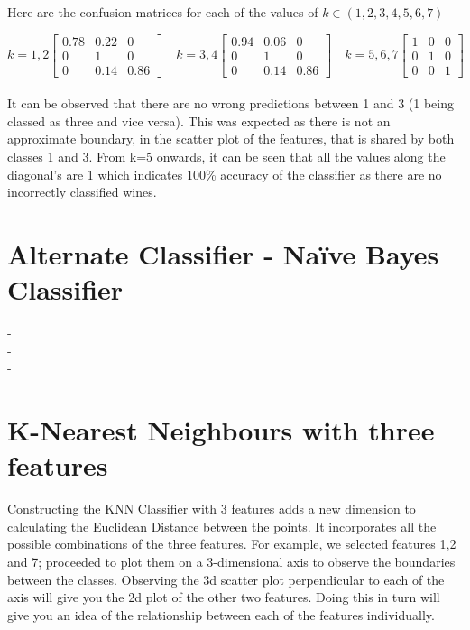\documentclass[10pt]{article}
\begin{document}
\noindent
Here are the confusion matrices for each of the values of $k \in (1,2,3,4,5,6,7)$

$$
k=1,2
\begin{bmatrix} 
0.78 & 0.22 & 0\\
0 & 1 & 0\\
0 & 0.14 & 0.86
\end{bmatrix}
\quad
k=3,4
\begin{bmatrix} 
0.94 & 0.06 & 0\\
0 & 1 & 0\\
0 & 0.14 & 0.86
\end{bmatrix}
\quad
k=5, 6, 7
\begin{bmatrix} 
1 & 0 & 0\\
0 & 1 & 0\\
0 & 0 & 1
\end{bmatrix}
\quad
$$
\\
\noindent
It can be observed that there are no wrong predictions between 1 and 3 (1 being classed as three and vice versa). This was expected as there is not an approximate boundary, in the scatter plot of the features, that is shared by both classes 1 and 3. From k=5 onwards, it can be seen that all the values along the diagonal's are 1 which indicates 100\% accuracy of the classifier as there are no incorrectly classified wines.

\section*{Alternate Classifier - Na\"ive Bayes Classifier}
-\\
-\\
-\\





\section*{K-Nearest Neighbours with three features}

Constructing the KNN Classifier with 3 features adds a new dimension to calculating the Euclidean Distance between the points. It incorporates all the possible combinations of the three features. For example, we selected features 1,2 and 7; proceeded to plot them on a 3-dimensional axis to observe the boundaries between the classes. Observing the 3d scatter plot perpendicular to each of the axis will give you the 2d plot of the other two features. Doing this in turn will give you an idea of the relationship between each of the features individually. \\
\end{document}
